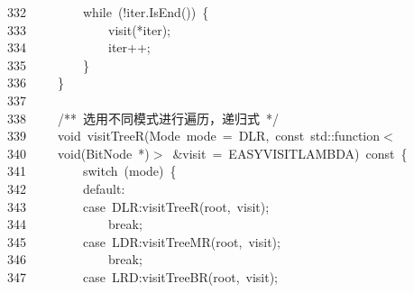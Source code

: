 \documentclass[11pt,a4paper]{ctexart}
\newcommand{\hlstd}[1]{\textcolor[rgb]{0.2,0.2,0.2}{#1}}
\newcommand{\hlcom}[1]{\textcolor[rgb]{0.59,0.59,0.59}{#1}}
\newcommand{\hlopt}[1]{\textcolor[rgb]{0.2,0.2,0.2}{#1}}
\newcommand{\hllin}[1]{\textcolor[rgb]{0.59,0.59,0.59}{#1}}
\newcommand{\hlkwa}[1]{\textcolor[rgb]{0.23,0.42,0.78}{#1}}
\newcommand{\hlkwb}[1]{\textcolor[rgb]{0.63,0,0.31}{#1}}
\newcommand{\hlkwc}[1]{\textcolor[rgb]{0,0.63,0.31}{#1}}
\newcommand{\hlkwd}[1]{\textcolor[rgb]{0.78,0.23,0.41}{#1}}
\begin{document}
\hllin{332\ }\hlstd{}\hlstd{\ \ \ \ \ \ \ \ }\hlstd{}\hlkwa{while\ }\hlstd{}\hlopt{(!}\hlstd{iter}\hlopt{.}\hlstd{}\hlkwd{IsEnd}\hlstd{}\hlopt{())\ \{}\\
\hllin{333\ }\hlstd{}\hlstd{\ \ \ \ \ \ \ \ \ \ \ \ }\hlstd{}\hlkwd{visit}\hlstd{}\hlopt{({*}}\hlstd{iter}\hlopt{);}\\
\hllin{334\ }\hlstd{}\hlstd{\ \ \ \ \ \ \ \ \ \ \ \ }\hlstd{iter}\hlopt{++;}\\
\hllin{335\ }\hlstd{}\hlstd{\ \ \ \ \ \ \ \ }\hlstd{}\hlopt{\}}\\
\hllin{336\ }\hlstd{}\hlstd{\ \ \ \ }\hlstd{}\hlopt{\}}\\
\hllin{337\ }\hlstd{}\\
\hllin{338\ }\hlstd{}\hlstd{\ \ \ \ }\hlstd{}\hlcom{/{*}{*}\ 选用不同模式进行遍历，递归式\ {*}/}\hlstd{}\\
\hllin{339\ }\hlstd{}\hlstd{\ \ \ \ }\hlstd{}\hlkwb{void\ }\hlstd{}\hlkwd{visitTreeR}\hlstd{}\hlopt{(}\hlstd{Mode\ mode\ }\hlopt{=\ }\hlstd{DLR}\hlopt{,\ }\hlstd{}\hlkwb{const\ }\hlstd{}\hlkwc{std}\hlstd{}\hlopt{::}\hlstd{function}\hlopt{$<$}\Righttorque\\
\hllin{340\ }\hlstd{}\hlstd{\ \ \ \ }\hlstd{}\hlkwb{void}\hlstd{}\hlopt{(}\hlstd{BitNode\ }\hlopt{{*})$>$\ \&}\hlstd{visit\ }\hlopt{=\ }\hlstd{EASY\textunderscore VISIT\textunderscore LAMBDA}\hlopt{)\ }\hlstd{}\hlkwb{const\ }\hlstd{}\hlopt{\{}\\
\hllin{341\ }\hlstd{}\hlstd{\ \ \ \ \ \ \ \ }\hlstd{}\hlkwa{switch\ }\hlstd{}\hlopt{(}\hlstd{mode}\hlopt{)\ \{}\\
\hllin{342\ }\hlstd{}\hlstd{\ \ \ \ \ \ \ \ }\hlstd{}\hlkwa{default}\hlstd{}\hlopt{:}\\
\hllin{343\ }\hlstd{}\hlstd{\ \ \ \ \ \ \ \ }\hlstd{}\hlkwa{case\ }\hlstd{DLR}\hlopt{:}\hlstd{}\hlkwd{visitTreeR}\hlstd{}\hlopt{(}\hlstd{root}\hlopt{,\ }\hlstd{visit}\hlopt{);}\\
\hllin{344\ }\hlstd{}\hlstd{\ \ \ \ \ \ \ \ \ \ \ \ }\hlstd{}\hlkwa{break}\hlstd{}\hlopt{;}\\
\hllin{345\ }\hlstd{}\hlstd{\ \ \ \ \ \ \ \ }\hlstd{}\hlkwa{case\ }\hlstd{LDR}\hlopt{:}\hlstd{}\hlkwd{visitTreeMR}\hlstd{}\hlopt{(}\hlstd{root}\hlopt{,\ }\hlstd{visit}\hlopt{);}\\
\hllin{346\ }\hlstd{}\hlstd{\ \ \ \ \ \ \ \ \ \ \ \ }\hlstd{}\hlkwa{break}\hlstd{}\hlopt{;}\\
\hllin{347\ }\hlstd{}\hlstd{\ \ \ \ \ \ \ \ }\hlstd{}\hlkwa{case\ }\hlstd{LRD}\hlopt{:}\hlstd{}\hlkwd{visitTreeBR}\hlstd{}\hlopt{(}\hlstd{root}\hlopt{,\ }\hlstd{visit}\hlopt{);}\\
\end{document}
